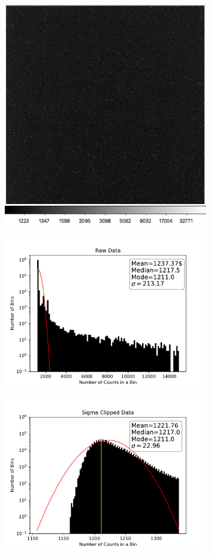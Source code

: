 \documentclass[preprint]{aastex62}
\begin{document}
        \begin{figure}
          \centering
            \includegraphics[width=3.5in]{../images/pos10dark_adjusted.png}
            \caption{}
          \label{fig:p10DARKfits}
        \end{figure}
        \begin{figure}
          \centering
            \includegraphics[width=3.5in]{../images/pos10DARK_noOutliers.pdf}
            \caption{}
          \label{fig:pos10DARKhisto}
        \end{figure}
        \begin{figure}
          \centering
            \includegraphics[width=3.5in]{../images/pos10DARK_cut.pdf}
            \caption{}
          \label{fig:pos10DARK_cut}
        \end{figure}
\end{document}
